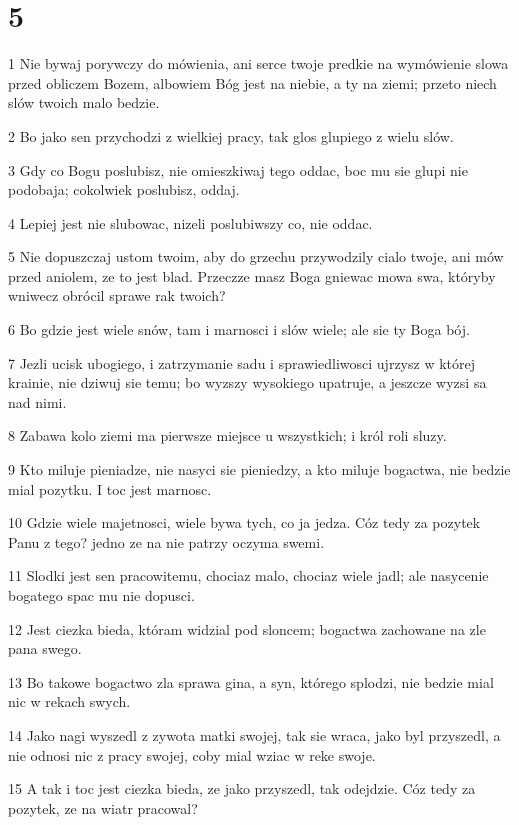\chapter{5}

\par 1 Nie bywaj porywczy do mówienia, ani serce twoje predkie na wymówienie slowa przed obliczem Bozem, albowiem Bóg jest na niebie, a ty na ziemi; przeto niech slów twoich malo bedzie.
\par 2 Bo jako sen przychodzi z wielkiej pracy, tak glos glupiego z wielu slów.
\par 3 Gdy co Bogu poslubisz, nie omieszkiwaj tego oddac, boc mu sie glupi nie podobaja; cokolwiek poslubisz, oddaj.
\par 4 Lepiej jest nie slubowac, nizeli poslubiwszy co, nie oddac.
\par 5 Nie dopuszczaj ustom twoim, aby do grzechu przywodzily cialo twoje, ani mów przed aniolem, ze to jest blad. Przeczze masz Boga gniewac mowa swa, któryby wniwecz obrócil sprawe rak twoich?
\par 6 Bo gdzie jest wiele snów, tam i marnosci i slów wiele; ale sie ty Boga bój.
\par 7 Jezli ucisk ubogiego, i zatrzymanie sadu i sprawiedliwosci ujrzysz w której krainie, nie dziwuj sie temu; bo wyzszy wysokiego upatruje, a jeszcze wyzsi sa nad nimi.
\par 8 Zabawa kolo ziemi ma pierwsze miejsce u wszystkich; i król roli sluzy.
\par 9 Kto miluje pieniadze, nie nasyci sie pieniedzy, a kto miluje bogactwa, nie bedzie mial pozytku. I toc jest marnosc.
\par 10 Gdzie wiele majetnosci, wiele bywa tych, co ja jedza. Cóz tedy za pozytek Panu z tego? jedno ze na nie patrzy oczyma swemi.
\par 11 Slodki jest sen pracowitemu, chociaz malo, chociaz wiele jadl; ale nasycenie bogatego spac mu nie dopusci.
\par 12 Jest ciezka bieda, któram widzial pod sloncem; bogactwa zachowane na zle pana swego.
\par 13 Bo takowe bogactwo zla sprawa gina, a syn, którego splodzi, nie bedzie mial nic w rekach swych.
\par 14 Jako nagi wyszedl z zywota matki swojej, tak sie wraca, jako byl przyszedl, a nie odnosi nic z pracy swojej, coby mial wziac w reke swoje.
\par 15 A tak i toc jest ciezka bieda, ze jako przyszedl, tak odejdzie. Cóz tedy za pozytek, ze na wiatr pracowal?
